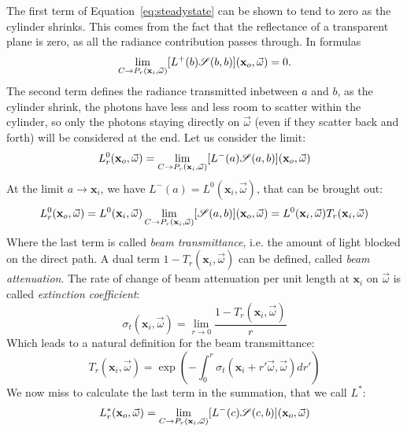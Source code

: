 The first term of Equation~\ref{eq:steadystate} can be shown to tend to zero as the cylinder shrinks. This comes from the fact that the reflectance of a transparent plane is zero, as all the radiance contribution passes through. In formulas
\begin{equation*}
\lim_{C\rightarrow P_r(\mathbf{x}_i,\vec{\omega})} [L^+(b)\mathscr{S}(b,b)] (\mathbf{x}_o, \vec{\omega}) = 0.
\end{equation*}
The second term defines the radiance transmitted inbetween $a$ and $b$, as the cylinder shrink, the photons have less and less room to scatter within the cylinder, so only the photons staying directly on $\vec{\omega}$ (even if they scatter back and forth) will be considered at the end. Let us consider the limit:
\begin{equation*}
L_r^0(\mathbf{x}_o, \vec{\omega}) = \lim_{C\rightarrow P_r(\mathbf{x}_i,\vec{\omega})} [L^-(a)\mathscr{S}(a,b)] (\mathbf{x}_o, \vec{\omega})
\end{equation*}
At the limit $a \rightarrow \mathbf{x}_i$, we have $L^-(a) = L^0(\mathbf{x}_i, \vec{\omega})$, that can be brought out: 
\begin{equation*}
L_r^0(\mathbf{x}_o, \vec{\omega}) = L^0(\mathbf{x}_i, \vec{\omega})\lim_{C\rightarrow P_r(\mathbf{x}_i,\vec{\omega})} [\mathscr{S}(a,b)] (\mathbf{x}_o, \vec{\omega}) = L^0(\mathbf{x}_i, \vec{\omega}) T_r(\mathbf{x}_i, \vec{\omega})
\end{equation*}
Where the last term is called \emph{beam transmittance}, i.e. the amount of light blocked on the direct path. A dual term $1 -  T_r(\mathbf{x}_i, \vec{\omega})$ can be defined, called \emph{beam attenuation}. The rate of change of beam attenuation per unit length at $\mathbf{x}_i$ on $\vec{\omega}$ is called \emph{extinction coefficient}:
\begin{equation*}
\sigma_t(\mathbf{x}_i, \vec{\omega}) = \lim_{r\rightarrow 0} \frac{1 - T_r(\mathbf{x}_i, \vec{\omega})}{r}
\end{equation*}
Which leads to a natural definition for the beam transmittance:
\begin{equation*}
T_r(\mathbf{x}_i, \vec{\omega}) = \exp\left(-\int_0^r \sigma_t(\mathbf{x}_i + r' \vec{\omega}, \vec{\omega}) dr'\right)
\end{equation*}
We now miss to calculate the last term in the summation, that we call $L^*$:
\begin{equation*}
L_r^*(\mathbf{x}_o, \vec{\omega}) = \lim_{C\rightarrow P_r(\mathbf{x}_i,\vec{\omega})} [L^-(c)\mathscr{S}(c,b)] (\mathbf{x}_o, \vec{\omega})
\end{equation*}
